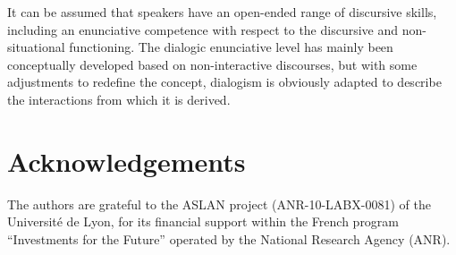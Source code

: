 \documentclass[output=paper]{langscibook}
\begin{document}
{It can be assumed that speakers have an open-ended range of discursive skills, including an enunciative competence with respect to the discursive and non-situational functioning. The dialogic enunciative level has mainly been conceptually developed based on non-interactive discourses, but with some adjustments to redefine the concept, dialogism is obviously adapted to describe the interactions from which it is derived.}

\section*{Acknowledgements}
The authors are grateful to the ASLAN project (ANR-10-LABX-0081) of the Université de Lyon, for its financial support within the French program “Investments for the Future” operated by the National Research Agency (ANR).

{\sloppy\printbibliography[heading=subbibliography,notkeyword=this]}
\end{document}

